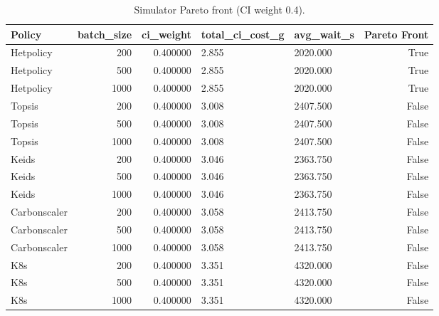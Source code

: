 \begin{table}
\caption{Simulator Pareto front (CI weight 0.4).}
\label{tab:sim-pareto}
\begin{tabular}{lrrllr}
\toprule
Policy & batch_size & ci_weight & total_ci_cost_g & avg_wait_s & Pareto Front \\
\midrule
Hetpolicy & 200 & 0.400000 & 2.855 & 2020.000 & True \\
Hetpolicy & 500 & 0.400000 & 2.855 & 2020.000 & True \\
Hetpolicy & 1000 & 0.400000 & 2.855 & 2020.000 & True \\
Topsis & 200 & 0.400000 & 3.008 & 2407.500 & False \\
Topsis & 500 & 0.400000 & 3.008 & 2407.500 & False \\
Topsis & 1000 & 0.400000 & 3.008 & 2407.500 & False \\
Keids & 200 & 0.400000 & 3.046 & 2363.750 & False \\
Keids & 500 & 0.400000 & 3.046 & 2363.750 & False \\
Keids & 1000 & 0.400000 & 3.046 & 2363.750 & False \\
Carbonscaler & 200 & 0.400000 & 3.058 & 2413.750 & False \\
Carbonscaler & 500 & 0.400000 & 3.058 & 2413.750 & False \\
Carbonscaler & 1000 & 0.400000 & 3.058 & 2413.750 & False \\
K8s & 200 & 0.400000 & 3.351 & 4320.000 & False \\
K8s & 500 & 0.400000 & 3.351 & 4320.000 & False \\
K8s & 1000 & 0.400000 & 3.351 & 4320.000 & False \\
\bottomrule
\end{tabular}
\end{table}
